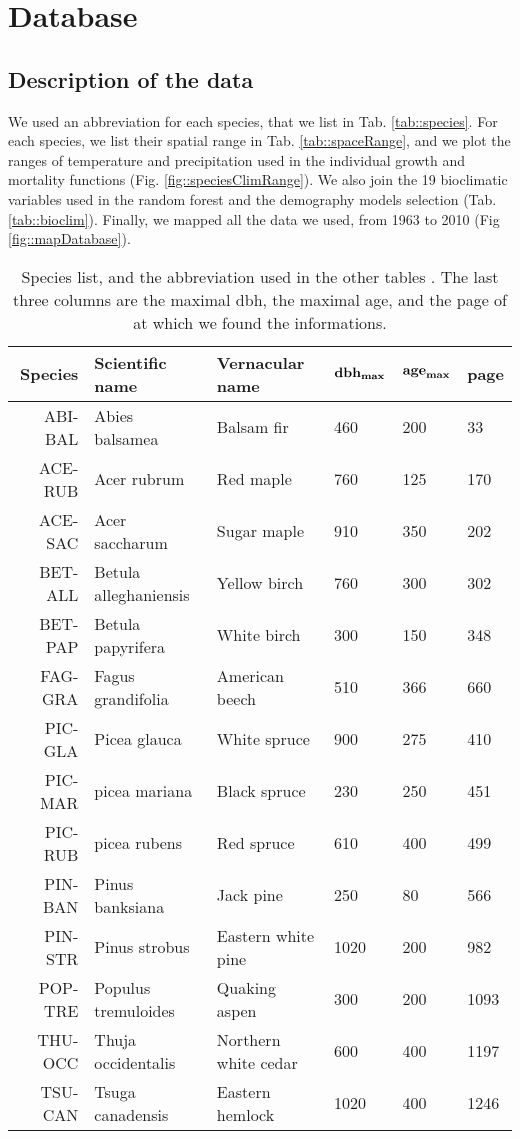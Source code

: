 \section{Database} \label{app::database}
\subsection{Description of the data}
\begin{refsection}
We used an abbreviation for each species, that we list in Tab. \ref{tab::species}. For each species, we list their spatial range in Tab. \ref{tab::spaceRange}, and we plot the ranges of temperature and precipitation used in the individual growth and mortality functions (Fig. \ref{fig::speciesClimRange}).  We also join the 19 bioclimatic variables used in the random forest and the demography models selection (Tab. \ref{tab::bioclim}). Finally, we mapped all the data we used, from 1963 to 2010 (Fig \ref{fig::mapDatabase}).

\begin{table}[h!]
\centering
\caption{Species list, and the abbreviation used in the other tables \label{tab::species}. The last three columns are the maximal dbh, the maximal age, and the page of \citet{Burns1990, Burns1990a} at which we found the informations.}
\label{tab::database}
\begin{tabular}{rlllll}
	\toprule
	\textbf{Species} & \textbf{Scientific name} & \textbf{Vernacular name} & $ \text{\textbf{dbh}}_{\bm{\max}} $ & $ \text{\textbf{age}}_{\bm{\max}} $ & \textbf{page} \\
	\midrule
	ABI-BAL & Abies balsamea & Balsam fir & 460 & 200 & 33 \\
	ACE-RUB & Acer rubrum & Red maple & 760 & 125 & 170 \\
	ACE-SAC & Acer saccharum & Sugar maple & 910 & 350 & 202 \\
	BET-ALL & Betula alleghaniensis & Yellow birch & 760 & 300 & 302 \\
	BET-PAP & Betula papyrifera & White birch & 300 & 150 & 348 \\
	FAG-GRA & Fagus grandifolia & American beech & 510 & 366 & 660 \\
	PIC-GLA & Picea glauca & White spruce & 900 & 275 & 410 \\
	PIC-MAR & picea mariana & Black spruce & 230 & 250 & 451 \\
	PIC-RUB & picea rubens & Red spruce & 610 & 400 & 499 \\
	PIN-BAN & Pinus banksiana & Jack pine & 250 &  80 & 566 \\
	PIN-STR & Pinus strobus & Eastern white pine & 1020 & 200 & 982 \\
	POP-TRE & Populus tremuloides & Quaking aspen & 300 & 200 & 1093 \\
	THU-OCC & Thuja occidentalis & Northern white cedar & 600 & 400 & 1197 \\
	TSU-CAN & Tsuga canadensis & Eastern hemlock & 1020 & 400 & 1246 \\
	\bottomrule
\end{tabular}
\end{table}


\end{refsection}
